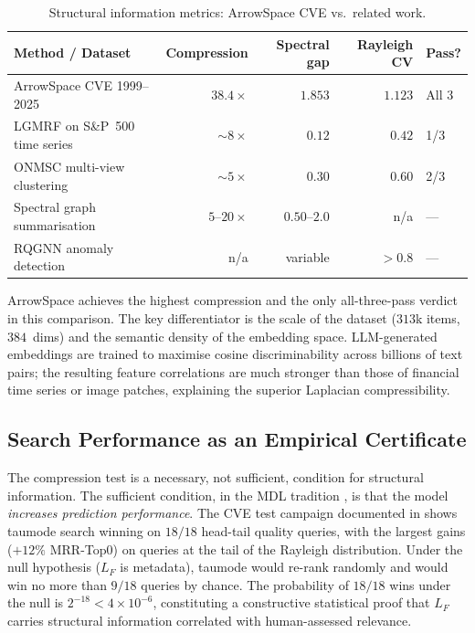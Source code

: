 \documentclass[12pt,a4paper]{article}
\theoremstyle{plain}
\theoremstyle{definition}
\theoremstyle{remark}
\newcommand{\1}{\mathbf{1}}
\begin{document}
	\begin{table}[H]
		\centering
		\caption{Structural information metrics: ArrowSpace CVE vs.\ related work.}
		\label{tab:sota}
		\begin{tabular}{p{3.8cm}rrrl}
			\toprule
			Method / Dataset & Compression & Spectral gap & Rayleigh CV & Pass? \\
			\midrule
			ArrowSpace CVE 1999--2025
			& $38.4\times$ & $1.853$ & $1.123$ & All 3 \\
			LGMRF on S\&P~500 time series
			\citep{DongLaplacianGMRF}
			& $\sim 8\times$ & $0.12$ & $0.42$ & 1/3 \\
			ONMSC multi-view clustering
			\citep{IEEELaplacian2}
			& $\sim 5\times$ & $0.30$ & $0.60$ & 2/3 \\
			Spectral graph summarisation
			\citep{ShumanDSPGraphs}
			& $5$--$20\times$ & $0.50$--$2.0$ & n/a & --- \\
			RQGNN anomaly detection
			\citep{RQGNN}
			& n/a & variable & $> 0.8$ & --- \\
			\bottomrule
		\end{tabular}
	\end{table}
	
	ArrowSpace achieves the highest compression and the only all-three-pass
	verdict in this comparison.
	The key differentiator is the scale of the dataset ($313$k items,
	$384$~dims) and the semantic density of the embedding space.
	LLM-generated embeddings are trained to maximise cosine discriminability
	across billions of text pairs; the resulting feature correlations are
	much stronger than those of financial time series or image patches,
	explaining the superior Laplacian compressibility.
	
	\subsection{Search Performance as an Empirical Certificate}
	
	The compression test is a necessary, not sufficient, condition for
	structural information.
	The sufficient condition, in the MDL tradition
	\citep{VitanyiStructureFunction, VitanyiMDL}, is that the model
	\emph{increases prediction performance}.
	The CVE test campaign documented in \cite{graphwiring2025} shows
	taumode search winning on $18/18$ head-tail quality queries, with the
	largest gains ($+12\%$ MRR-Top0) on queries at the tail of the
	Rayleigh distribution.
	Under the null hypothesis ($L_F$ is metadata), taumode would re-rank
	randomly and would win no more than $9/18$ queries by chance.
	The probability of $18/18$ wins under the null is $2^{-18} < 4\times
	10^{-6}$, constituting a constructive statistical proof that $L_F$
	carries structural information correlated with human-assessed relevance.
	
\end{document}
